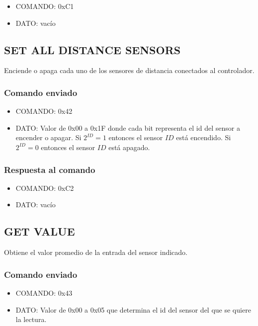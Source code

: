\documentclass[a4paper,10pt]{article}
\begin{document}
\begin{itemize}
	\item{COMANDO:} 0xC1
	\item{DATO:} vac\'io
\end{itemize}

\subsection{SET ALL DISTANCE SENSORS}
\label{set_all_distance_sensors}

Enciende o apaga cada uno de los sensores de distancia conectados al controlador.

\subsubsection*{Comando enviado}

\begin{itemize}
	\item{COMANDO:} 0x42
	\item{DATO:} Valor de 0x00 a 0x1F donde cada bit representa el id del sensor a encender o apagar.
	Si $2^{ID} = 1$ entonces el sensor $ID$ est\'a encendido.
	Si $2^{ID} = 0$ entonces el sensor $ID$ est\'a apagado.
\end{itemize}

\subsubsection*{Respuesta al comando}

\begin{itemize}
	\item{COMANDO:} 0xC2
	\item{DATO:} vac\'io
\end{itemize}


\subsection{GET VALUE}
\label{get_value_ds}

Obtiene el valor promedio de la entrada del sensor indicado.

\subsubsection*{Comando enviado}

\begin{itemize}
	\item{COMANDO:} 0x43
	\item{DATO:} Valor de 0x00 a 0x05 que determina el id del sensor del que se quiere la lectura.
\end{itemize}
\end{document}
